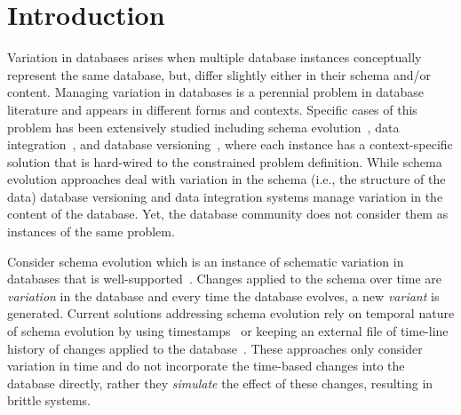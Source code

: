 \section{Introduction}
\label{sec:intro}


\begin{comment}
simple streamline direction:
- variation in db is everywhere
- active research for some instances of it
- other instances aren't well-covered and well-supported
- the combination of instances

a general solution that 
- can model variation for well-covered variation
- others
\end{comment}


Variation in databases arises when multiple database instances 
conceptually represent the same database, but, differ
slightly either in their schema and/or content. 
%
Managing variation in databases is a perennial problem in database literature
and appears in different forms and contexts.
Specific cases of this problem has been extensively studied including 
schema evolution~\cite{}, 
data integration~\cite{}, 
and database versioning~\cite{},
where each instance has a context-specific solution that is hard-wired
to the constrained problem definition. 
%
While schema
evolution approaches deal with variation in the schema (i.e., the structure
of the data) database versioning and data integration systems 
manage variation in the content of the database. Yet, the database
community does not consider them as instances of the same problem.

Consider schema evolution which is an instance of schematic variation in databases
that is well-supported~\cite{SchEvolRA90McKenzie, 
schVersioning97Castro, tempSchEvol91Ariav, tsql95Snodgrass, 
prima08Moon}.
Changes applied to the schema over time are \emph{variation} 
in the database and every time the database evolves, a new
\emph{variant} is generated.
Current solutions addressing schema
evolution rely on temporal nature of schema evolution by using
timestamps~\cite{SchEvolRA90McKenzie, schVersioning97Castro, 
tempSchEvol91Ariav, tsql95Snodgrass} 
or keeping an external file of time-line history of 
changes applied to the database~\cite{prima08Moon}. 
These approaches only consider variation in time and do not
incorporate the time-based changes into
the database directly, rather they \emph{simulate} the effect of these changes,
resulting in brittle systems.

